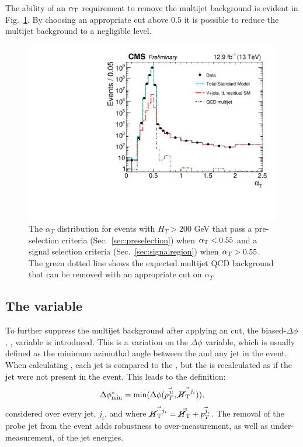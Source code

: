 The ability of an $\alpha_{\text{T}}$ requirement to remove the \QCD multijet
background is evident in Fig.~\ref{fig:alphaT}. By
choosing an appropriate cut above $0.5$ it is possible to reduce the
multijet background to a negligible level.

\begin{figure}
	\begin{center}
		\includegraphics[width=0.7\linewidth]{figs/analysis/eventSelection/CMS-PAS-SUS-16-016_Figure-aux_001}%
	\end{center}
  \caption{The $\alpha_T$ distribution for events with $H_T>200$ GeV
  that pass a pre-selection criteria (Sec.~\ref{sec:preselection}) when
  $\alpha_{\text{T}}<0.55$ and a signal selection criteria
  (Sec.~\ref{sec:signalregion}) when
  $\alpha_{\text{T}}>0.55$. The green dotted line shows the expected multijet
  QCD background that can be removed with an appropriate cut on
  $\alpha_T$}
	\label{fig:alphaT}
\end{figure}

\subsection{The \bdphi variable}

To further suppress the \QCD multijet background after applying an
\alphat cut, the biased-$\Delta\phi$, \bdphi, variable is introduced.
This is a variation on the $\Delta\phi$ variable, which is usually
defined as the minimum azimuthal angle between the \MET and any jet in
the event. When calculating \bdphi, each jet is compared to the
\MHT, but the \MHT is recalculated as if the jet were not present in
the event. This leads to the definition:
\begin{equation}
\mbox{$\Delta\phi^{*}_{\rm min}$} = \mathrm{min}(\Delta\phi(\vec{p_T^{j_i}},\vec{\mbox{$\cancel{H}_\text{T}$}^{j_i}})),
\end{equation}
considered over every jet, $j_i$, and where
$\vec{\mbox{$\cancel{H}_\text{T}$}^{j_i}}=\vec{\mbox{$\cancel{H}_\text{T}$}}+\vec{p_T^{j_i}}$. The removal of the
probe jet from the event adds robustness to over-measurement, as well
as under-measurement, of the jet energies.

